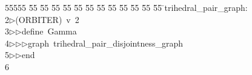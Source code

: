 %
%
\begin{tabbing}
55555 \= 55 \= 55 \= 55 \= 55 \= 55 \= 55 \= 55 \= 55 \= 55 \= 55 \= 55 \= 55 \= \>trihedral\_pair\_graph:\\[0pt]
2\>$\triangleright$\>(ORBITER)\ v\ 2\ \\[0pt]
3\>$\triangleright$\>$\triangleright$\>define\ Gamma\ \\[0pt]
4\>$\triangleright$\>$\triangleright$\>$\triangleright$\>graph\ trihedral\_pair\_disjointness\_graph\ \\[0pt]
5\>$\triangleright$\>$\triangleright$\>end\\[0pt]
6\>\end{tabbing}
